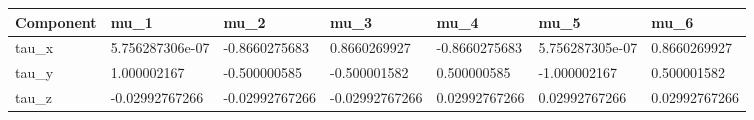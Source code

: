 \begin{tabular}{@{}lllllll@{}}
\toprule
Component & mu\_1 & mu\_2 & mu\_3 & mu\_4 & mu\_5 & mu\_6 \\
\midrule
tau\_x & 5.756287306e-07 & -0.8660275683 & 0.8660269927 & -0.8660275683 & 5.756287305e-07 & 0.8660269927 \\
tau\_y & 1.000002167 & -0.500000585 & -0.500001582 & 0.500000585 & -1.000002167 & 0.500001582 \\
tau\_z & -0.02992767266 & -0.02992767266 & -0.02992767266 & 0.02992767266 & 0.02992767266 & 0.02992767266 \\
\bottomrule
\end{tabular}
